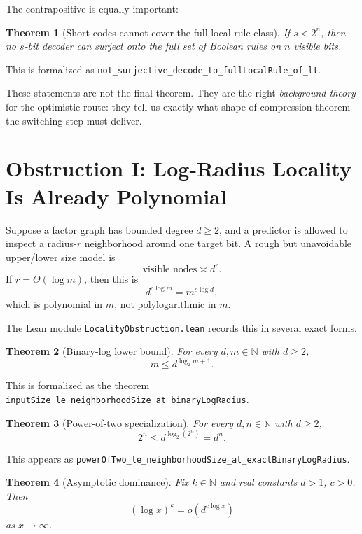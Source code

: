 \documentclass[11pt]{article}
\newtheorem{theorem}{Theorem}[section]
\theoremstyle{remark}
\begin{document}
The contrapositive is equally important:

\begin{theorem}[Short codes cannot cover the full local-rule class]
If \(s < 2^n\), then no \(s\)-bit decoder can surject onto the full set of Boolean rules on
\(n\) visible bits.
\end{theorem}

\noindent
This is formalized as
\texttt{not\_surjective\_decode\_to\_fullLocalRule\_of\_lt}.

These statements are not the final theorem.  They are the right \emph{background theory} for
the optimistic route: they tell us exactly what shape of compression theorem the switching
step must deliver.

\section{Obstruction I: Log-Radius Locality Is Already Polynomial}

Suppose a factor graph has bounded degree $d \ge 2$, and a predictor is allowed to inspect a
radius-$r$ neighborhood around one target bit.  A rough but unavoidable upper/lower size model is
\[
  \text{visible nodes} \asymp d^r.
\]
If $r = \Theta(\log m)$, then this is
\[
  d^{c \log m} = m^{c \log d},
\]
which is polynomial in $m$, not polylogarithmic in $m$.

The Lean module \texttt{LocalityObstruction.lean} records this in several exact forms.

\begin{theorem}[Binary-log lower bound]
For every $d,m \in \mathbb{N}$ with $d \ge 2$,
\[
  m \le d^{\log_2 m + 1}.
\]
\end{theorem}

\noindent
This is formalized as the theorem
\texttt{inputSize\_le\_neighborhoodSize\_at\_binaryLogRadius}.

\begin{theorem}[Power-of-two specialization]
For every $d,n \in \mathbb{N}$ with $d \ge 2$,
\[
  2^n \le d^{\log_2(2^n)} = d^n.
\]
\end{theorem}

\noindent
This appears as
\texttt{powerOfTwo\_le\_neighborhoodSize\_at\_exactBinaryLogRadius}.

\begin{theorem}[Asymptotic dominance]
Fix $k \in \mathbb{N}$ and real constants $d>1$, $c>0$.  Then
\[
  (\log x)^k = o\!\left(d^{c \log x}\right)
\]
as $x \to \infty$.
\end{theorem}
\end{document}
